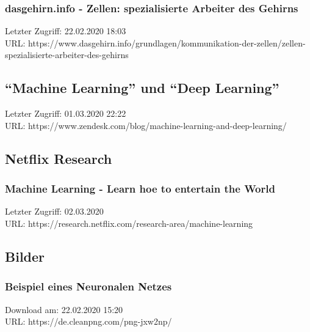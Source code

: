 	\subsubsection{dasgehirn.info - Zellen: spezialisierte Arbeiter des Gehirns}
	\label{subsubsec:dasgehirn:Zellen-Arbeiter_Des_Gehrins}
	Letzter Zugriff: 22.02.2020 18:03\\
	URL: https://www.dasgehirn.info/grundlagen/kommunikation-der-zellen/zellen-spezialisierte-arbeiter-des-gehirns

\subsection{\enquote{Machine Learning} und \enquote{Deep Learning}}
\label{subsec:machine_learning_and_deep_learning}
	Letzter Zugriff: 01.03.2020 22:22\\
	URL: https://www.zendesk.com/blog/machine-learning-and-deep-learning/

\subsection{Netflix Research}
\label{Netlfix_Research}
	\subsubsection{Machine Learning - Learn hoe to entertain the World}
	\label{Netflix_Research:machine_learning_learn_how_to_entertain_the_world}
	Letzter Zugriff: 02.03.2020\\
	URL: https://research.netflix.com/research-area/machine-learning

\subsection{Bilder}
\label{subsec:Bilder_Anhang}
	\subsubsection{Beispiel eines Neuronalen Netzes}
	\label{subsubsec:Beispiel_eines_Neuronalen_Netzes}
	Download am: 22.02.2020 15:20\\
	URL: https://de.cleanpng.com/png-jxw2np/